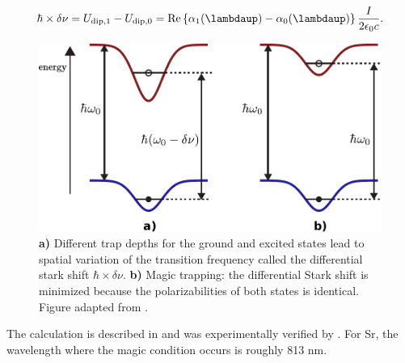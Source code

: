 \begin{equation}\label{eq:DifferentialStarkShift}
    \hbar \times \delta \nu = U_{\text{dip},1} - U_{\text{dip},0} = 
    \operatorname{Re}\left\{\alpha_1(\lambdaup)-\alpha_0(\lambdaup)\right\} \frac{I}{2 \epsilon_0 c}.
\end{equation}
\begin{figure}
    \centering
    \includegraphics[width=0.65\linewidth]{figures/MagicTrapping.pdf}
    \caption{\textbf{a)} Different trap depths for the ground and excited states lead to spatial variation of the transition frequency called the differential stark shift $\hbar \times \delta \nu$.
    \textbf{b)} Magic trapping: the differential Stark shift is minimized because the polarizabilities of both states is identical.
    Figure adapted from \cite{Lundblad2010}.}
    \label{fig:MagicTrapping}
\end{figure}
The calculation is described in \cite{Madjarov2020,Boyd2007} and was experimentally verified by \cite{Takamoto2005}.
For Sr, the wavelength where the magic condition occurs is roughly 813 nm. 






	

